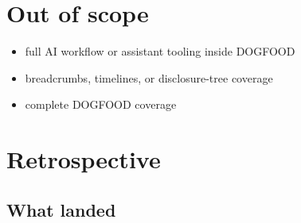 \section{Out of scope}\label{record-074-out-of-scope}

\begin{itemize}
\tightlist
\item
  full AI workflow or assistant tooling inside DOGFOOD
\item
  breadcrumbs, timelines, or disclosure-tree coverage
\item
  complete DOGFOOD coverage
\end{itemize}

\section{Retrospective}\label{record-074-retrospective}

\subsection{What landed}\label{record-074-what-landed}

